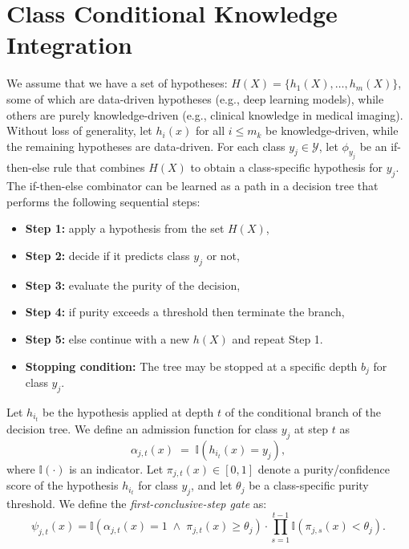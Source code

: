 \documentclass[runningheads]{llncs}
\begin{document}
\section{Class Conditional Knowledge Integration}
We assume that we have a set of hypotheses: $H(X) = \{h_1(X), \ldots, h_m(X)\}$, some of which are data-driven hypotheses (e.g., deep learning models), while others are purely knowledge-driven (e.g., clinical knowledge in medical imaging). Without loss of generality, let $h_i(x)$ for all $i \le m_k$ be knowledge-driven, while the remaining hypotheses are data-driven. For each class $y_j \in \mathcal{Y}$, let $\phi_{y_j}$ be an if-then-else rule that combines $H(X)$ to obtain a class-specific hypothesis for $y_j$. The if-then-else combinator can be learned as a path in a decision tree that performs the following sequential steps:
\begin{itemize}
\item \textbf{Step 1:} apply a hypothesis from the set $H(X)$,
\item \textbf{Step 2:} decide if it predicts class $y_j$ or not,
\item \textbf{Step 3:} evaluate the purity of the decision,
\item \textbf{Step 4:} if purity exceeds a threshold then terminate the branch,
\item \textbf{Step 5:} else continue with a new $h(X)$ and repeat Step 1.
\item \textbf{Stopping condition:} The tree may be stopped at a specific depth $b_j$ for class $y_j$.
\end{itemize}

Let $h_{i_t}$ be the hypothesis applied at depth $t$ of the conditional branch of the decision tree.
We define an admission function for class $y_j$ at step $t$ as
\[
\alpha_{j,t}(x) \;=\; \mathbb{I}\!\left(h_{i_t}(x)=y_j\right),
\]
where $\mathbb{I}(\cdot)$ is an indicator. Let $\pi_{j,t}(x)\in[0,1]$ denote a purity/confidence score
of the hypothesis $h_{i_t}$ for class $y_j$, and let $\theta_j$ be a class-specific purity threshold.
We define the \emph{first-conclusive-step gate} as:
{\scriptsize
\begin{equation}
\label{eqn:CCKII}
\psi_{j,t}(x)
=
\mathbb{I}\!\left(\alpha_{j,t}(x)=1 \;\wedge\; \pi_{j,t}(x)\ge \theta_j\right)
\cdot
\prod_{s=1}^{t-1}
\mathbb{I}\!\left(\pi_{j,s}(x)< \theta_j\right).
\end{equation}
}
\end{document}
